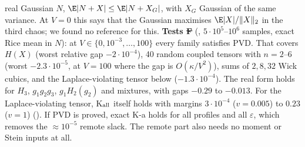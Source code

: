 real Gaussian $N$, $\E|N+X|\le\E|N+X_G|$, with $X_G$ Gaussian of the same variance. At $V=0$ this says that the Gaussian maximises $\E|X|/\|X\|_2$ in the third chaos; we found no
reference for this.
\textbf{Tests \st{F}} (, $5\cdot10^5$--$10^6$ samples, exact Rice mean in $N$): at $V\in\{0,10^{-3},\dots,100\}$ every family satisfies PVD. That covers $H(X)$ (worst relative
gap $-2\cdot10^{-4}$), 40 random coupled tensors with $n=2$--$6$ (worst $-2.3\cdot10^{-5}$, at $V=100$ where the gap is $O(\kappa/V^2)$), sums of $2,8,32$ Wick cubics, and the
Laplace-violating tensor below ($-1.3\cdot10^{-4}$). The real form holds for $H_3$, $g_1g_2g_3$, $g_1H_2(g_2)$ and mixtures, with gaps $-0.29$ to $-0.013$. For the Laplace-violating
tensor, K$_{\rm all}$ itself holds with margins $3\cdot10^{-4}$ ($v=0.005$) to $0.23$ ($v=1$) (). If PVD is proved, exact K-a holds for all profiles and all $\varepsilon$,
which removes the $\approx10^{-5}$ remote slack. The remote part also needs no moment or Stein inputs at all.

